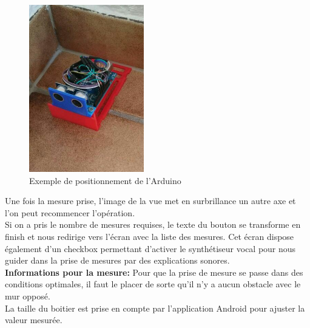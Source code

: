 \begin{figure}[H]
	\begin{center}
		\includegraphics[width=5cm]{img/arduino.jpg}
		\caption{Exemple de positionnement de l'Arduino}
		\label{arduino}
	\end{center}
\end{figure}
Une fois la mesure prise, l'image de la vue met en surbrillance un autre axe et l'on peut recommencer l'opération.\\ Si on a pris le nombre de mesures requises, le texte du bouton se transforme en finish et nous redirige vers l'écran avec la liste des mesures. Cet écran dispose également d'un checkbox permettant d'activer le synthétiseur vocal pour nous guider dans la prise de mesures par des explications sonores.\\
\textbf{Informations pour la mesure: } Pour que la prise de mesure se passe dans des conditions optimales, il faut le placer de sorte qu'il n'y a aucun obstacle avec le mur opposé. \\
La taille du boitier est prise en compte par l'application Android pour ajuster la valeur mesurée.
